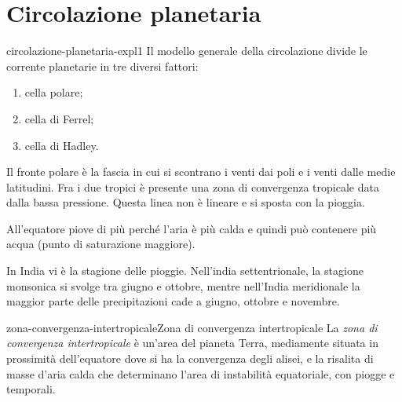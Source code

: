 \documentclass[preview]{standalone}
\begin{document}
\genpage

\section{Circolazione planetaria}


\begin{snippet}{circolazione-planetaria-expl1}
    Il modello generale della circolazione divide le corrente planetarie in tre diversi fattori:
    \begin{enumerate}
        \item cella polare;
        \item cella di Ferrel;
        \item cella di Hadley.
    \end{enumerate}
\end{snippet}

\begin{plainhtml}
    Il fronte polare è la fascia in cui si scontrano i venti dai poli e i venti dalle medie latitudini.
    Fra i due tropici è presente una zona di convergenza tropicale data dalla bassa pressione.
    Questa linea non è lineare e si sposta con la pioggia.
\end{plainhtml}

\begin{plainhtml}
    All'equatore piove di più perché l'aria è più calda e quindi può contenere più acqua (punto di saturazione maggiore).
\end{plainhtml}

\begin{plainhtml}
    In India vi è la stagione delle pioggie. Nell'india settentrionale,
    la stagione monsonica si svolge tra giugno e
    ottobre, mentre nell'India meridionale la maggior parte
    delle precipitazioni cade a giugno, ottobre e novembre.
\end{plainhtml}

\begin{snippetdefinition}{zona-convergenza-intertropicale}{Zona di convergenza intertropicale}
    La \textit{zona di convergenza intertropicale} è un'area del pianeta Terra, mediamente situata in prossimità dell'equatore
    dove si ha la convergenza degli alisei, e la risalita di masse d'aria calda che determinano l'area di instabilità equatoriale, con piogge e temporali.
\end{snippetdefinition}
\end{document}

